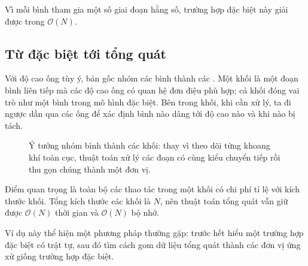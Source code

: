 \documentclass[11pt]{article}
\newcommand{\Oh}{\mathcal{O}}
\begin{document}
Vì mỗi bình tham gia một số giai đoạn hằng số, trường hợp đặc biệt này giải
được trong \(\Oh(N)\).

\subsection{Từ đặc biệt tới tổng quát}

Với độ cao ống tùy ý, bản gốc nhóm các bình thành các . Một khối là
một đoạn bình liên tiếp mà các độ cao ống có quan hệ đơn điệu phù hợp; cả khối
đóng vai trò như một bình trong mô hình đặc biệt. Bên trong khối, khi cần xử
lý, ta đi ngược dần qua các ống để xác định bình nào dâng tới độ cao nào và
khi nào bị tách.

\begin{figure}[htbp]
\centering
{}
\caption{Ý tưởng nhóm bình thành các khối: thay vì theo dõi từng khoang khí toàn cục, thuật toán xử lý các đoạn có cùng kiểu chuyển tiếp rồi thu gọn chúng thành một đơn vị.}
\end{figure}

Điểm quan trọng là toàn bộ các thao tác trong một khối có chi phí tỉ lệ với
kích thước khối. Tổng kích thước các khối là \(N\), nên thuật toán tổng quát
vẫn giữ được \(\Oh(N)\) thời gian và \(\Oh(N)\) bộ nhớ.

Ví dụ này thể hiện một phương pháp thường gặp: trước hết hiểu một trường hợp
đặc biệt có trật tự, sau đó tìm cách gom dữ liệu tổng quát thành các đơn vị
ứng xử giống trường hợp đặc biệt.
\end{document}
